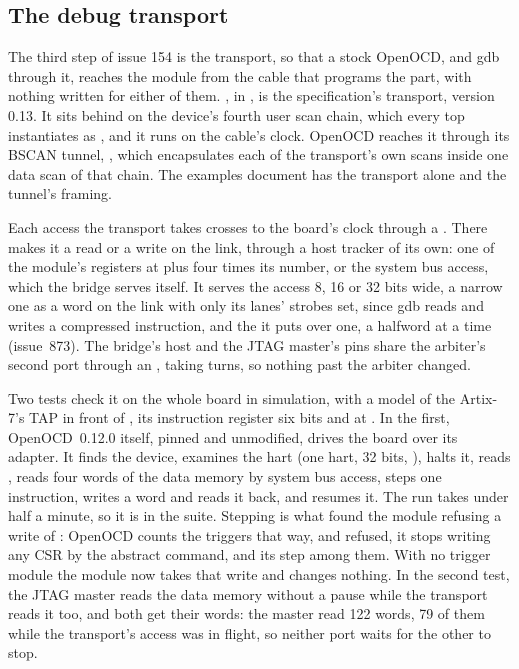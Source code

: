 \documentclass[journal,onecolumn,9pt]{IEEEtran}
\begin{document}
\subsection{The debug transport}
\label{sec:v-dtm}

The third step of issue 154 is the transport, so that a stock
OpenOCD, and gdb through it, reaches the module from the cable that
programs the part, with nothing written for either of them.
, in , is the specification's
transport, version 0.13. It sits behind  on the
device's fourth user scan chain, which every top instantiates as
, and it runs on the cable's clock. OpenOCD
reaches it through its BSCAN tunnel, , which encapsulates each of the transport's own scans inside one data
scan of that chain. The examples document has the transport alone
and the tunnel's framing.

Each access the transport takes crosses to the board's clock through
a . There  makes it a read or a write on
the link, through a host tracker of its own: one of the module's
registers at  plus four times its number, or the
system bus access, which the bridge serves itself. It serves the access
8, 16 or 32 bits wide, a narrow one as a word on the link with only
its lanes' strobes set, since gdb reads and writes a compressed
instruction, and the  it puts over one, a halfword at a
time (issue~873). The bridge's host
and the JTAG master's pins share the arbiter's second port through
an , taking turns, so nothing past the arbiter changed.

Two tests check it on the whole board in simulation, with a model of
the Artix-7's TAP in front of , its instruction
register six bits and  at . In the first,
OpenOCD~0.12.0 itself, pinned and unmodified, drives the board over
its  adapter. It finds the device, examines the
hart (one hart, 32 bits,  ), halts it,
reads , reads four words of the data memory by system bus
access, steps one instruction, writes a word and reads it back, and
resumes it. The run takes under half a minute, so it is
in the suite. Stepping is what found the module refusing a write of
: OpenOCD counts the triggers that way, and refused, it
stops writing any CSR by the abstract command,  and its
step among them. With no trigger module the module now takes that
write and changes nothing. In the second test, the JTAG master reads the data memory
without a pause while the transport reads it too, and both get their
words: the master read 122 words, 79 of them while the transport's
access was in flight, so neither port waits for the other to stop.
\end{document}
